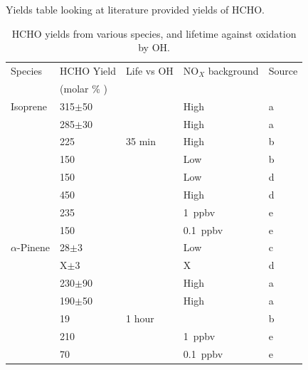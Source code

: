     Yields table looking at literature provided yields of HCHO.
    
    \begin{table} \begin{threeparttable}
      \caption{ HCHO yields from various species, and lifetime against oxidation by OH. }
      \begin{tabular}{  l  l  l  l  l  }
        \toprule
        Species    & HCHO Yield    & Life vs OH   & NO$_X$ background & Source   \\
                   & (molar \% )   &              &                   &          \\
        \midrule 
        Isoprene	& 315$\pm$50      &            & High          & a        \\ 
                  & 285$\pm$30      &            & High          & a        \\ 
                  & 225             & 35 min     & High          & b        \\ %
                  & 150             &            & Low           & b        \\ %
                  & 150             &            & Low           & d        \\
                  & 450             &            & High          & d        \\
                  & 235             &            & 1~ppbv        & e        \\
                  & 150             &            & 0.1~ppbv      & e        \\
        $\alpha$-Pinene & 28$\pm$3        &        & Low                & c        \\ 
                        & X$\pm$3         &        & X                  & d        \\ 
                        & 230$\pm$90      &        & High        & a        \\ 
                        & 190$\pm$50      &        & High        & a        \\ 
                        & 19              & 1 hour &              & b        \\ %
                        & 210             &        & 1~ppbv        & e        \\
                        & 70              &        & 0.1~ppbv      & e        \\

\end{tabular}
\end{threeparttable}
\end{table}
